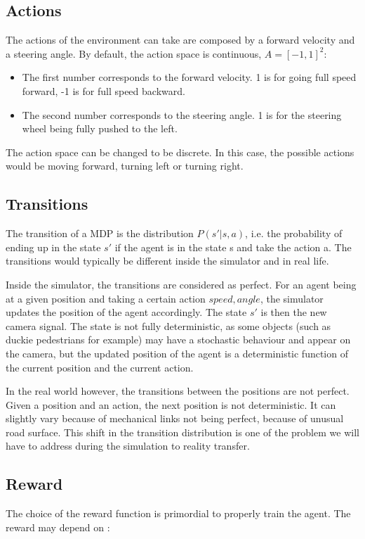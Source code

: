 \documentclass[12pt]{article}
\begin{document}
\subsection{Actions}
The actions of the environment can take are composed by a forward velocity and a steering angle. By default, the action space is continuous, $A = [-1, 1]^2$:
\begin{itemize}
    \item The first number corresponds to the forward velocity. 1 is for going full speed forward, -1 is for full speed backward.
    \item The second number corresponds to the steering angle. 1 is for the steering wheel being fully pushed to the left.
\end{itemize}

The action space can be changed to be discrete. In this case, the possible actions would be moving forward, turning left or turning right.

\subsection{Transitions}
The transition of a MDP is the distribution $P(s'| s, a)$, i.e. the probability of ending up in the state $s'$ if the agent is in the state s and take the action a. The transitions would typically be different inside the simulator and in real life.

Inside the simulator, the transitions are considered as perfect. For an agent being at a given position and taking a certain action  ${speed, angle}$, the simulator updates the position of the agent accordingly. The state $s'$ is then the new camera signal. The state is not fully deterministic, as some objects (such as duckie pedestrians for example) may have a stochastic behaviour and appear on the camera, but the updated position of the agent is a deterministic function of the current
position and the current action.

In the real world however, the transitions between the positions are not perfect. Given a position and an action, the next position is not deterministic. It can slightly vary because of mechanical links not being perfect, because of unusual road surface. This shift in the transition distribution is one of the problem we will have to address during the simulation to reality transfer.

\subsection{Reward}
The choice of the reward function is primordial to properly train the agent. The reward may depend on :
\end{document}
